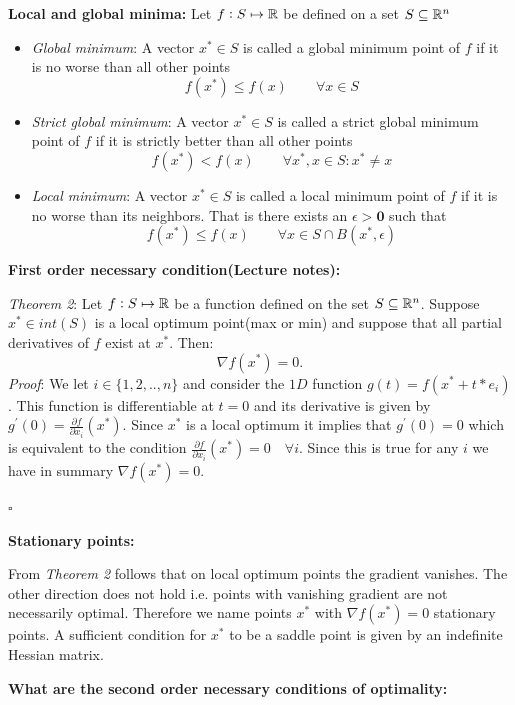 \documentclass[12pt,a4paper]{article}
\begin{document}
	\textbf{Local and global minima:}
	Let $f: S \mapsto \mathbb{R}$ be defined on a set $S \subseteq \mathbb{R}^n$ 
		\begin{itemize}
			\item[] \textit{Global minimum}:
				A vector $x^* \in S$ is called a global minimum point of $f$ if it is no worse than all other points
				$$ f(x^*) \le f(x) \qquad \forall x \in S$$ 
			\item[] \textit{Strict global minimum}:
				A vector $x^* \in S$ is called a strict global minimum point of $f$ if it is strictly better than all other points
				$$ f(x^*) < f(x) \qquad \forall x^*,x \in S : x^* \neq x $$ 
			\item[] \textit{Local minimum}:
				A vector $x^* \in S$ is called a local minimum point of $f$ if it is no worse than its neighbors.
				That is there exists an $\epsilon > \textbf{0}$ such that
				$$ f(x^*) \le f(x) \qquad \forall x \in S \cap B(x^*, \epsilon) $$ 		
			
		\end{itemize}
	
	\textbf{First order necessary condition(Lecture notes):}
	
		\textit{Theorem 2}: Let $f : S \mapsto \mathbb{R}$ be a function defined on the set $S \subseteq \mathbb{R}^n$.
		Suppose $x^* \in int(S)$ is a local optimum point(max or min) and suppose that all partial derivatives of $f$ exist at $x^*$.
		Then:
		$$\nabla f(x^*) = 0.$$
		\textit{Proof}: We let $i \in \{1,2,..,n\}$ and consider the $1D$ function $g(t) = f(x^* + t * e_i)$.
		This function is differentiable at $t = 0$ and its derivative is given by $g^{'}(0) = \frac{\partial f}{\partial x_i}(x^*)$.
		Since $x^*$ is a local optimum it implies that $g^{'}(0) = 0 $ which is equivalent to the condition $\frac{\partial f}{\partial x_i}(x^*) = 0  \quad  \forall i$. Since this is true for any $i$ we have in summary $\nabla f(x^*) = 0$.
		\begin{flushright}
			$\square$
		\end{flushright}
	
	
	\textbf{Stationary points:}
	
		From \textit{Theorem 2} follows  that on local optimum points the gradient vanishes. The other direction does not hold i.e. points with vanishing gradient are not necessarily optimal.
		Therefore we name points $x^*$ with $\nabla f(x^*) = 0$ stationary points.
		A sufficient condition for $x^*$ to be a saddle point is given by an indefinite Hessian matrix.
	
	\textbf{What are the second order necessary conditions of optimality:}
		
\end{document}
